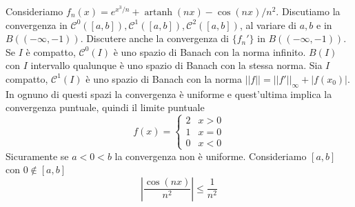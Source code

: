 \documentclass[a4paper]{article}
\begin{document}
\begin{snippetexample}{}
    Consideriamo \(f_n(x) = e^{x^3 / n} + \operatorname{artanh}(nx) - \cos(nx) / n^2\).
    Discutiamo la convergenza in \(\mathcal C^0([a,b]), \mathcal C^1([a,b]), \mathcal C^2([a,b])\),
    al variare di \(a,b\) e in \(B((-\infty, -1))\).
    Discutere anche la convergenza di \(\{f_n'\}\) in \(B((-\infty, -1))\).
    Se \(I\) è compatto, \(\mathcal C^0(I)\) è uno spazio di Banach con la norma infinito.
    \(B(I)\) con \(I\) intervallo qualunque è uno spazio di Banach con la stessa norma.
    Sia \(I\) compatto, \(\mathcal C^1(I)\) è uno spazio di Banach con la norma \(||f|| = ||f'||_{\infty} + |f(x_0)|\).
    In ognuno di questi spazi la convergenza è uniforme e quest'ultima implica la convergenza puntuale,
    quindi il limite puntuale
    \[
        f(x) = \begin{cases}
            2 & x > 0 \\
            1 & x = 0 \\
            0 & x < 0
        \end{cases}
    \]
    Sicuramente se \(a<0<b\) la convergenza non è uniforme.
    Consideriamo \([a,b]\) con \(0 \notin [a,b]\)
    \[
        \left|
            \frac{\cos(nx)}{n^2}
        \right| \leq \frac{1}{n^2}
    \]
\end{snippetexample}


\pagebreak
\end{document}
